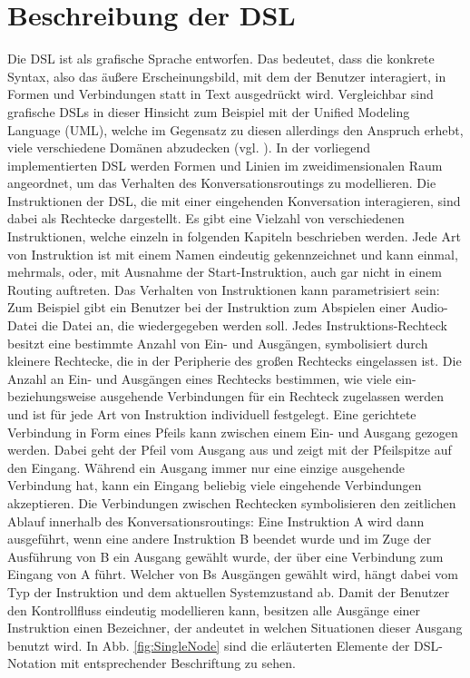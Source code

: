 \section{Beschreibung der DSL}
Die DSL ist als grafische Sprache entworfen. Das bedeutet, dass die konkrete Syntax, also das äußere Erscheinungsbild, mit dem der Benutzer interagiert, in Formen und Verbindungen statt in Text ausgedrückt wird. Vergleichbar sind grafische DSLs in dieser Hinsicht zum Beispiel mit der Unified Modeling Language (UML), welche im Gegensatz zu diesen allerdings den Anspruch erhebt, viele verschiedene Domänen abzudecken (vgl. \cite[S. 17]{Booch:05}).
\newline 
In der vorliegend implementierten DSL werden Formen und Linien im zweidimensionalen Raum angeordnet, um das Verhalten des Konversationsroutings zu modellieren. Die Instruktionen der DSL, die mit einer eingehenden Konversation interagieren, sind dabei als Rechtecke dargestellt. Es gibt eine Vielzahl von verschiedenen Instruktionen, welche einzeln in folgenden Kapiteln beschrieben werden. Jede Art von  Instruktion ist mit einem Namen eindeutig gekennzeichnet und kann einmal, mehrmals, oder, mit Ausnahme der Start-Instruktion, auch gar nicht in einem Routing auftreten. Das Verhalten von Instruktionen kann parametrisiert sein: Zum Beispiel gibt ein Benutzer bei der Instruktion zum Abspielen einer Audio-Datei die Datei an, die wiedergegeben werden soll. Jedes Instruktions-Rechteck besitzt eine bestimmte Anzahl von Ein- und Ausgängen, symbolisiert durch kleinere Rechtecke, die in der Peripherie des großen Rechtecks eingelassen ist. Die Anzahl an Ein- und Ausgängen eines Rechtecks bestimmen, wie viele ein- beziehungsweise ausgehende Verbindungen für ein Rechteck zugelassen werden und ist für jede Art von Instruktion individuell festgelegt. Eine gerichtete Verbindung in Form eines Pfeils kann zwischen einem Ein- und Ausgang gezogen werden. Dabei geht der Pfeil vom Ausgang aus und zeigt mit der Pfeilspitze auf den Eingang. Während ein Ausgang immer nur eine einzige ausgehende Verbindung hat, kann ein Eingang beliebig viele eingehende Verbindungen akzeptieren. Die Verbindungen zwischen Rechtecken symbolisieren den zeitlichen Ablauf innerhalb des Konversationsroutings: Eine Instruktion A wird dann ausgeführt, wenn eine andere Instruktion B beendet wurde und im Zuge der Ausführung von B ein Ausgang gewählt wurde, der über eine Verbindung zum Eingang von A führt. Welcher von Bs Ausgängen gewählt wird, hängt dabei vom Typ der Instruktion und dem aktuellen Systemzustand ab. Damit der Benutzer den Kontrollfluss eindeutig modellieren kann, besitzen alle Ausgänge einer Instruktion einen Bezeichner, der andeutet in welchen Situationen dieser Ausgang benutzt wird.  In Abb. \ref{fig:SingleNode} sind die erläuterten Elemente der DSL-Notation mit entsprechender Beschriftung zu sehen.
